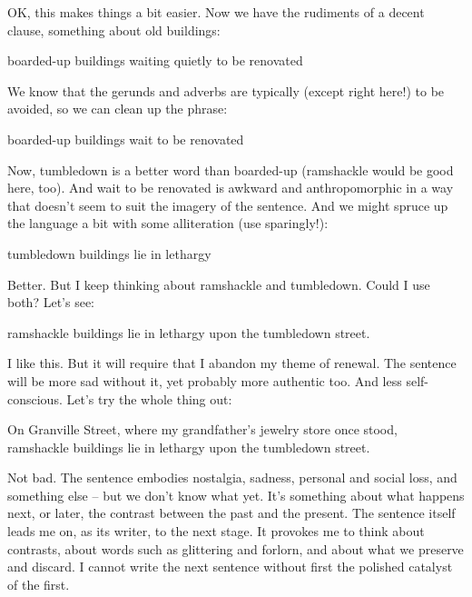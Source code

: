 \documentclass[letterpaper,10pt,headsepline]{scrreprt}
\begin{document}
OK, this makes things a bit easier. Now we have the rudiments of a decent clause, something about old buildings:
\vspace{1em}

\textsf{boarded-up buildings waiting quietly to be renovated}
\vspace{1em}

We know that the gerunds and adverbs are typically (except right here!) to be avoided, so we can clean up the phrase:
\vspace{1em}

\textsf{boarded-up buildings wait} to be renovated
\vspace{1em}

Now, \textsf{tumbledown} is a better word than \textsf{boarded-up} (\textsf{ramshackle} would be good here, too). And \textsf{wait to be renovated} is awkward and anthropomorphic in a way that doesn't seem to suit the imagery of the sentence. And we might spruce up the language a bit with some alliteration (use sparingly!):
\vspace{1em}

\textsf{tumbledown buildings lie in lethargy}
\vspace{1em}

Better. But I keep thinking about \textsf{ramshackle} and \textsf{tumbledown}. Could I use both? Let's see:
\vspace{1em}

\textsf{ramshackle buildings lie in lethargy upon the tumbledown street.}
\vspace{1em}

I like this. But it will require that I abandon my theme of renewal. The sentence will be more sad without it, yet probably more authentic too. And less self-conscious. Let's try the whole thing out:
\vspace{1em}

\textsf{On Granville Street, where my grandfather's jewelry store once stood, \\
ramshackle buildings lie in lethargy upon the tumbledown street.}
\vspace{1em}

Not bad. The sentence embodies nostalgia, sadness, personal and social loss, and something else -- but we don't know what yet. It's something about what happens next, or later, the contrast between the past and the present. The sentence itself leads me on, as its writer, to the next stage. It provokes me to think about contrasts, about words such as \textsf{glittering} and \textsf{forlorn}, and about what we preserve and discard. I cannot write the next sentence without first the polished catalyst of the first.
\end{document}
